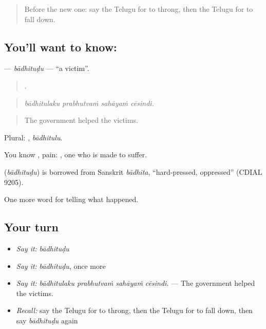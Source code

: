 \label{lesson:TE-C379-badhitudu}



\begin{quote}
Before the new one: say the Telugu for to throng, then the Telugu for to fall down.
\end{quote}

\subsection*{You'll want to know: }
\textbf{} — \emph{bādhituḍu} — \textquotedblleft{}a victim\textquotedblright{}.

\begin{quote}
   .
\end{quote}

\begin{quote}
\emph{bādhitulaku prabhutvaṁ sahāyaṁ cēsindi.}
\end{quote}

\begin{quote}
The government helped the victims.
\end{quote}

Plural: , \emph{bādhitulu}.

You know , pain: , one who is made to suffer.

\begin{cousinweb}
\textbf{} (\emph{bādhituḍu}) is borrowed from Sanskrit \emph{bādhita}, \textquotedblleft{}hard-pressed, oppressed\textquotedblright{} (CDIAL 9205).
\end{cousinweb}

\begin{grammarlens}[title={What you've built}]
One more word for telling what happened.
\end{grammarlens}

\subsection*{Your turn}
\begin{itemize}
\raggedright
  \item \emph{Say it:} \emph{bādhituḍu}
  \item \emph{Say it:} \emph{bādhituḍu}, once more
  \item \emph{Say it:} \emph{bādhitulaku prabhutvaṁ sahāyaṁ cēsindi.} — The government helped the victims.
  \item \emph{Recall:} say the Telugu for to throng, then the Telugu for to fall down, then say \emph{bādhituḍu} again
\end{itemize}

